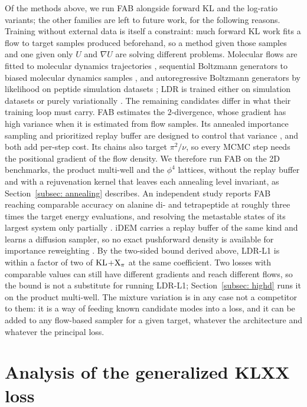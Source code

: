 \documentclass{article}
\begin{document}
Of the methods above, we run FAB alongside forward KL and the log-ratio variants; the other families are left to future work, for the following reasons. Training without external data is itself a constraint: much forward KL work fits a flow to target samples produced beforehand, so a method given those samples and one given only $U$ and $\nabla U$ are solving different problems. Molecular flows are fitted to molecular dynamics trajectories \citep{klein2023equivariant,klein2024transferable}, sequential Boltzmann generators to biased molecular dynamics samples \citep{tan2025sequential}, and autoregressive Boltzmann generators by likelihood on peptide simulation datasets \citep{rehman2026autoregressive}; LDR is trained either on simulation datasets or purely variationally \citep{schopmans2026ldr}. The remaining candidates differ in what their training loop must carry. FAB estimates the $2$-divergence, whose gradient has high variance when it is estimated from flow samples. Its annealed importance sampling and prioritized replay buffer are designed to control that variance \citep{midgley2022flow}, and both add per-step cost. Its chains also target $\pi^2/\nu$, so every MCMC step needs the positional gradient of the flow density. We therefore run FAB on the 2D benchmarks, the product multi-well and the $\phi^4$ lattices, without the replay buffer and with a rejuvenation kernel that leaves each annealing level invariant, as Section~\ref{subsec: annealing} describes. An independent study reports FAB reaching comparable accuracy on alanine di- and tetrapeptide at roughly three times the target energy evaluations, and resolving the metastable states of its largest system only partially \citep{schopmans2025temperature}. iDEM carries a replay buffer of the same kind and learns a diffusion sampler, so no exact pushforward density is available for importance reweighting \citep{akhound2024iterated}. By the two-sided bound derived above, LDR-L1 is within a factor of two of $\mathrm{KL}$+$\mathrm{X}_\pi$ at the same coefficient. Two losses with comparable values can still have different gradients and reach different flows, so the bound is not a substitute for running LDR-L1; Section~\ref{subsec: highd} runs it on the product multi-well. The mixture variation is in any case not a competitor to them: it is a way of feeding known candidate modes into a loss, and it can be added to any flow-based sampler for a given target, whatever the architecture and whatever the principal loss.

\section{Analysis of the generalized KLXX loss}
\label{sec: FR}
\end{document}
